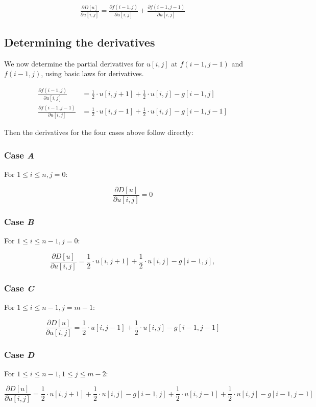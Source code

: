 \documentclass[a4paper]{scrreprt}
\begin{document}
\begin{align*}
		\frac{\partial D[u]}{\partial u[i, j]} = \frac{\partial f(i - 1, j)}{\partial u[i, j]} + \frac{\partial f(i - 1, j - 1)}{\partial u[i, j]}
\end{align*}

\subsection{Determining the derivatives}

We now determine the partial derivatives for $u[i, j]$ at $f(i - 1, j - 1)$ and
$f(i - 1, j)$, using basic laws for derivatives.

\begin{align*}
		\frac{\partial f(i - 1, j)}{\partial u[i, j]} & =
		\frac{1}{2} \cdot u[i, j + 1] + \frac{1}{2} \cdot u[i, j] - g[i - 1, j] \\
		\frac{\partial f(i - 1, j - 1)}{\partial u[i, j]} & =
		\frac{1}{2} \cdot u[i, j - 1] + \frac{1}{2} \cdot u[i, j] - g[i - 1, j - 1]
\end{align*}

Then the derivatives for the four cases above follow directly:

\subsubsection{Case \emph{A}}

For $1 \leq i \leq n, j = 0$:

\[
		\frac{\partial D[u]}{\partial u[i, j]} = 0
\]

\subsubsection{Case \emph{B}}

For $1 \leq i \leq n - 1, j = 0$:

\[
		\frac{\partial D[u]}{\partial u[i, j]} =
		\frac{1}{2} \cdot u[i, j + 1] + \frac{1}{2} \cdot u[i, j] - g[i - 1, j],
\]

\subsubsection{Case \emph{C}}

For $1 \leq i \leq n - 1, j = m - 1$:

\[
		\frac{\partial D[u]}{\partial u[i, j]} =
		\frac{1}{2} \cdot u[i, j - 1] + \frac{1}{2} \cdot u[i, j] - g[i - 1, j - 1]
\]

\subsubsection{Case \emph{D}}

For $1 \leq i \leq n - 1, 1 \leq j \leq m - 2$:

\[
		\frac{\partial D[u]}{\partial u[i, j]} =
						  \frac{1}{2} \cdot u[i, j + 1] + \frac{1}{2} \cdot u[i, j] - g[i - 1, j] + \frac{1}{2} \cdot u[i, j - 1] + \frac{1}{2} \cdot u[i, j] - g[i - 1, j - 1]
\]

\printbibliography
\end{document}
